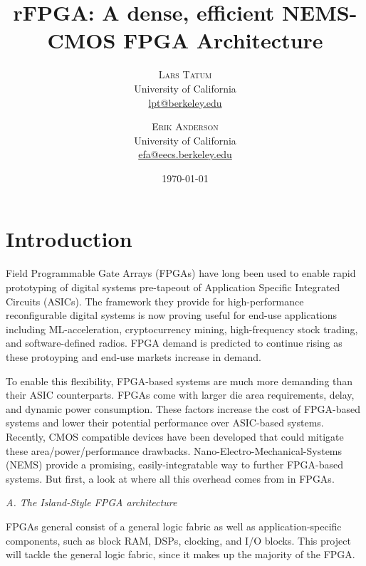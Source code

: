 \documentclass[twoside,twocolumn]{article}
\title{rFPGA: A dense, efficient NEMS-CMOS FPGA Architecture} %
\author{%
\textsc{Lars Tatum}\\[1ex] %
\normalsize University of California \\ %
\normalsize \href{mailto:lpt@berkeley.edu}{lpt@berkeley.edu} %
\and %
\textsc{Erik Anderson}\\[1ex] %
\normalsize University of California \\ %
\normalsize \href{mailto:efa@eecs.berkeley.edu}{efa@eecs.berkeley.edu} %
}
\date{\today} %
\begin{document}
\maketitle


\section{Introduction}
Field Programmable Gate Arrays (FPGAs) have long been used to enable rapid prototyping of digital systems pre-tapeout of Application Specific Integrated Circuits (ASICs)\cite{8187326}. The framework they provide for high-performance reconfigurable digital systems is now proving useful for end-use applications including ML-acceleration, cryptocurrency mining, high-frequency stock trading, and software-defined radios. FPGA demand is predicted to continue rising as these protoyping and end-use markets increase in demand.

To enable this flexibility, FPGA-based systems are much more demanding than their ASIC counterparts. FPGAs come with larger die area requirements, delay, and dynamic power consumption. These factors increase the cost of FPGA-based systems and lower their potential performance over ASIC-based systems. Recently, CMOS compatible devices have been developed that could mitigate these area/power/performance drawbacks.  Nano-Electro-Mechanical-Systems (NEMS) provide a promising, easily-integratable way to further FPGA-based systems. But first, a look at where all this overhead comes from in FPGAs.

\textit{A. The Island-Style FPGA architecture}

FPGAs general consist of a general logic fabric as well as application-specific components, such as block RAM, DSPs, clocking, and I/O blocks\cite{8187326}. This project will tackle the general logic fabric, since it makes up the majority of the FPGA.
\end{document}
